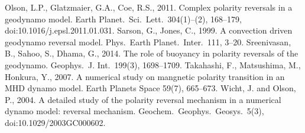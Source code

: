 \begin{thebibliography}{}
%
Olson, L.P., Glatzmaier, G.A., Coe, R.S., 2011. Complex polarity reversals in a geodynamo model. Earth Planet.\ Sci.\ Lett.\ 304(1)--(2), 168--179, doi:10.1016/j.epsl.2011.01.031.
%
Sarson, G., Jones, C., 1999. A convection driven geodynamo reversal model. Phys.\ Earth Planet.\ Inter.\ 111, 3--20.
%
Sreenivasan, B., Sahoo, S., Dhama, G., 2014. The role of buoyancy in polarity reversals of the geodynamo. Geophys.\ J. Int.\ 199(3), 1698--1709.
%
Takahashi, F., Matsushima, M., Honkura, Y., 2007. A numerical study on mangnetic polarity transition in an MHD dynamo model. Earth Planets Space 59(7), 665--673.
%
%
Wicht, J. and Olson, P., 2004. A detailed study of the polarity reversal mechanism in a numerical dynamo model: reversal mechanism. Geochem.\ Geophys.\ Geosys.\ 5(3), doi:10.1029/2003GC000602.
%
%
\end{thebibliography}